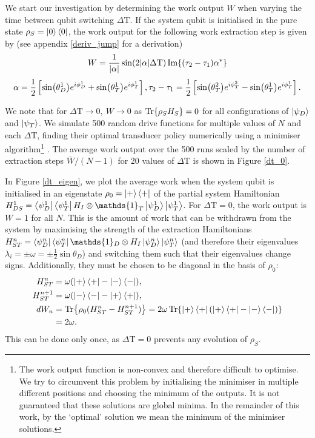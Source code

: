 We start our investigation by determining the work output $W$ when varying the time between qubit switching $\Delta \mathrm{T}$.
If the system qubit is initialised in the pure state $\rho_S = \ket{0} \bra{0}$, the work output for the following work extraction step is given by (see appendix \ref{deriv_jump} for a derivation)
\begin{equation} \label{single_work}
	W = \frac{1}{\abs{\alpha}} \sin(2\abs{\alpha}\Delta \mathrm{T}) \Im{(\tau_2 - \tau_1) \alpha^*}
\end{equation}
\begin{equation*}
	\alpha = \frac{1}{2} \left[\sin(\theta_D^1) e^{i\phi_D^1} + \sin(\theta_T^1) e^{i\phi_T^1}\right], \\
	\tau_2 - \tau_1 = \frac{1}{2} \left[ \sin(\theta_T^2)e^{i\phi_T^2} - \sin(\theta_T^1)e^{i\phi_T^1} \right].
\end{equation*}

We note that for $\Delta \mathrm{T} \to 0, \ W \to 0$ as $\Tr{\rho_S H_S} = 0$ for all configurations of $\ket{\psi_D}$ and $ \ket{\psi_T}$.
We simulate 500 random drive functions for multiple values of $N$ and each $\Delta \mathrm{T}$, finding their optimal transducer policy numerically using a minimiser algorithm\footnote{The work output function is non-convex and therefore difficult to optimise. We try to circumvent this problem by initialising the minimiser in multiple different positions and choosing the minimum of the outputs. It is not guaranteed that these solutions are global minima. In the remainder of this work, by the `optimal' solution we mean the minimum of the minimiser solutions.} \cite{2020SciPy-NMeth}. The average work output over the 500 runs scaled by the number of extraction steps $\overline{W}/(N-1)$ for 20 values of $\Delta \mathrm{T}$ is shown in Figure \ref{dt_0}.

In Figure \ref{dt_eigen}, we plot the average work when the system qubit is initialised in an eigenstate $\rho_0 = \ket{+}\bra{+}$ of the partial system Hamiltonian $H^1_{DS} = \bra{\psi_D^1} \bra{\psi_T^{1}} H_I \otimes \mathds{1}_T \ket{\psi_D^1} \ket{\psi_T^1}$.
For $\Delta \mathrm{T} = 0$, the work output is $W = 1$ for all $N$.
This is the amount of work that can be withdrawn from the system by maximising the strength of the extraction Hamiltonians $H^n_{ST} = \bra{\psi_D^n} \bra{\psi_T^{n}} \mathds{1}_D \otimes H_I  \ket{\psi_D^n} \ket{\psi_T^n}$ (and therefore their eigenvalues $\lambda_i = \pm \omega = \pm \frac{1}{2} \sin \theta_D$) and switching them such that their eigenvalues change signs. Additionally, they must be chosen to be diagonal in the basis of $\rho_0$:
\begin{align*}
	H_{ST}^n &= \omega (\ket{+}\bra{+} - \ket{-}\bra{-}), \\
	H_{ST}^{n+1} &= \omega (\ket{-}\bra{-} - \ket{+}\bra{+}), \\
	dW_n &= \Tr{\rho_0 (H_{ST}^n - H_{ST}^{n+1})} = 2 \omega \Tr{\ket{+}\bra{+} (\ket{+}\bra{+} - \ket{-}\bra{-}) } \\
	&= 2 \omega.
\end{align*}
This can be done only once, as $\Delta \mathrm{T} = 0$ prevents any evolution of $\rho_S$.

